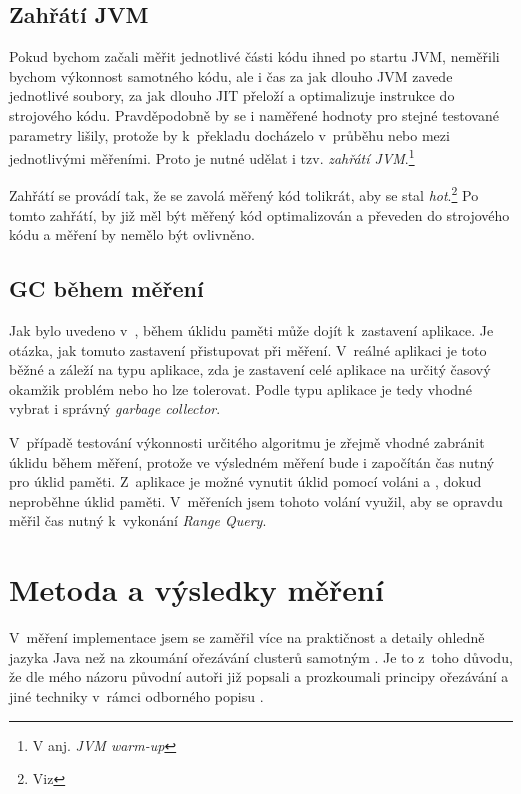 \subsection{Zahřátí JVM}

Pokud bychom začali měřit jednotlivé části kódu ihned po startu JVM, neměřili bychom výkonnost samotného kódu, ale i čas za jak dlouho JVM zavede jednotlivé \classfile soubory, za jak dlouho JIT přeloží a optimalizuje instrukce \bytecode{} do strojového kódu. Pravděpodobně by se i naměřené hodnoty pro stejné testované parametry lišily, protože by k~překladu docházelo v~průběhu nebo mezi jednotlivými měřeními. Proto je nutné udělat i tzv. \emph{zahřátí JVM}.\footnote{V anj. \emph{JVM warm-up}}

Zahřátí se provádí tak, že se zavolá měřený kód tolikrát, aby se stal \emph{hot}.\footnote{Viz } Po tomto zahřátí, by již měl být měřený kód optimalizován a převeden do strojového kódu a měření by nemělo být ovlivněno.

\subsection{GC během měření}
Jak bylo uvedeno v~, během úklidu paměti může dojít k~zastavení aplikace.
Je otázka, jak tomuto zastavení přistupovat při měření.
V~reálné aplikaci je toto běžné a záleží na typu aplikace, zda je zastavení celé aplikace na určitý časový okamžik problém nebo ho lze tolerovat.
Podle typu aplikace je tedy vhodné vybrat i správný \emph{garbage collector}.

V~případě testování výkonnosti určitého algoritmu je zřejmě vhodné zabránit úklidu během měření, protože ve výsledném měření bude i započítán čas nutný pro úklid paměti.
Z~aplikace je možné vynutit úklid pomocí voláni  a , dokud neproběhne úklid paměti.
V~měřeních jsem tohoto volání využil, aby se opravdu měřil čas nutný k~vykonání \emph{Range Query}.

\section{Metoda a výsledky měření}
V~měření implementace  jsem se zaměřil více na praktičnost a detaily ohledně jazyka Java než na zkoumání ořezávání clusterů samotným .
Je to z~toho důvodu, že dle mého názoru původní autoři již popsali a prozkoumali principy ořezávání a jiné techniky v~rámci odborného popisu .
 
